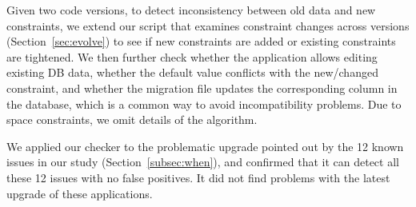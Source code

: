 Given two code versions, to detect inconsistency between old data and new constraints, we extend our script that examines constraint changes across versions (Section~\ref{sec:evolve}) to see if new constraints are added or existing
constraints are tightened. We then further check whether the application allows editing existing
DB data, whether the default value conflicts with the new/changed constraint, and whether the migration
file updates the corresponding column in the database, which is a common way to avoid incompatibility
problems. Due to space constraints, we omit details of the algorithm.

We applied our checker to the problematic upgrade pointed out by the 12 known issues in our study
(Section~\ref{subsec:when}), and confirmed that it can detect all these 12 issues with no false positives. It did not find problems with the latest upgrade 
of these applications.  

